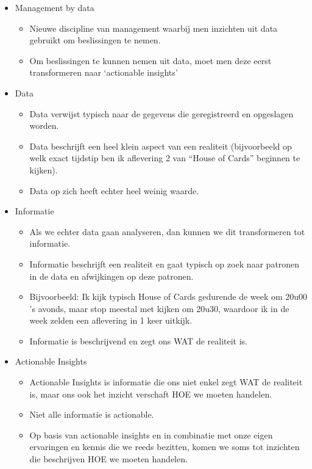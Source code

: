 \documentclass[]{memoir}
\providecommand{\tightlist}{%
  \setlength{\itemsep}{0pt}\setlength{\parskip}{0pt}}
\begin{document}
\begin{itemize}
\tightlist
\item
  Management by data

  \begin{itemize}
  \tightlist
  \item
    Nieuwe discipline van management waarbij men inzichten uit data gebruikt om beslissingen te nemen.
  \item
    Om beslissingen te kunnen nemen uit data, moet men deze eerst transformeren naar `actionable insights'
  \end{itemize}
\item
  Data

  \begin{itemize}
  \tightlist
  \item
    Data verwijst typisch naar de gegevens die geregistreerd en opgeslagen worden.
  \item
    Data beschrijft een heel klein aspect van een realiteit (bijvoorbeeld op welk exact tijdstip ben ik aflevering 2 van ``House of Cards'' beginnen te kijken).
  \item
    Data op zich heeft echter heel weinig waarde.
  \end{itemize}
\item
  Informatie

  \begin{itemize}
  \tightlist
  \item
    Als we echter data gaan analyseren, dan kunnen we dit transformeren tot informatie.
  \item
    Informatie beschrijft een realiteit en gaat typisch op zoek naar patronen in de data en afwijkingen op deze patronen.
  \item
    Bijvoorbeeld: Ik kijk typisch House of Cards gedurende de week om 20u00 's avonds, maar stop meestal met kijken om 20u30, waardoor ik in de week zelden een aflevering in 1 keer uitkijk.
  \item
    Informatie is beschrijvend en zegt ons WAT de realiteit is.
  \end{itemize}
\item
  Actionable Insights

  \begin{itemize}
  \tightlist
  \item
    Actionable Insights is informatie die ons niet enkel zegt WAT de realiteit is, maar ons ook het inzicht verschaft HOE we moeten handelen.
  \item
    Niet alle informatie is actionable.
  \item
    Op basis van actionable insights en in combinatie met onze eigen ervaringen en kennis die we reeds bezitten, komen we soms tot inzichten die beschrijven HOE we moeten handelen.
  \end{itemize}
\end{itemize}
\end{document}
